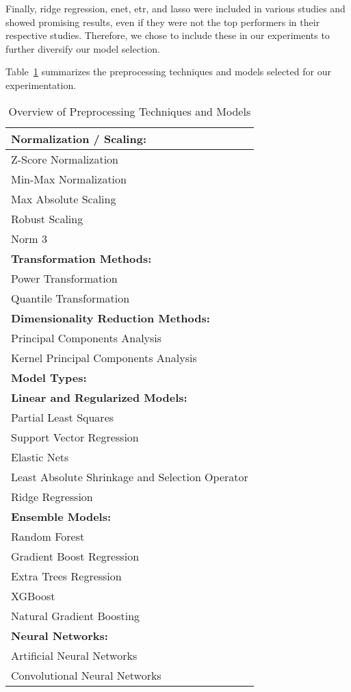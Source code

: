 Finally, ridge regression, \gls{enet}, \gls{etr}, and \gls{lasso} were included in various studies and showed promising results, even if they were not the top performers in their respective studies.
Therefore, we chose to include these in our experiments to further diversify our model selection.

Table~\ref{tab:preprocessing-models} summarizes the preprocessing techniques and models selected for our experimentation.

\begin{table}[ht]
\centering
\begin{tabularx}{\columnwidth}{>{\raggedright\arraybackslash}X}
\toprule
\textbf{Normalization / Scaling:} \\
\midrule
Z-Score Normalization \\
Min-Max Normalization \\
Max Absolute Scaling \\
Robust Scaling \\
Norm 3 \\
\midrule
\textbf{Transformation Methods:} \\
\midrule
Power Transformation \\
Quantile Transformation \\
\midrule
\textbf{Dimensionality Reduction Methods:} \\
\midrule
Principal Components Analysis \\
Kernel Principal Components Analysis \\
\midrule
\textbf{Model Types:} \\
\midrule
\textbf{Linear and Regularized Models:} \\
\quad Partial Least Squares \\
\quad Support Vector Regression \\
\quad Elastic Nets \\
\quad Least Absolute Shrinkage and Selection Operator \\
\quad Ridge Regression \\
\textbf{Ensemble Models:} \\
\quad Random Forest \\
\quad Gradient Boost Regression \\
\quad Extra Trees Regression \\
\quad XGBoost \\
\quad Natural Gradient Boosting \\
\textbf{Neural Networks:} \\
\quad Artificial Neural Networks \\
\quad Convolutional Neural Networks \\\bottomrule
\end{tabularx}
\caption{Overview of Preprocessing Techniques and Models}
\label{tab:preprocessing-models}
\end{table}